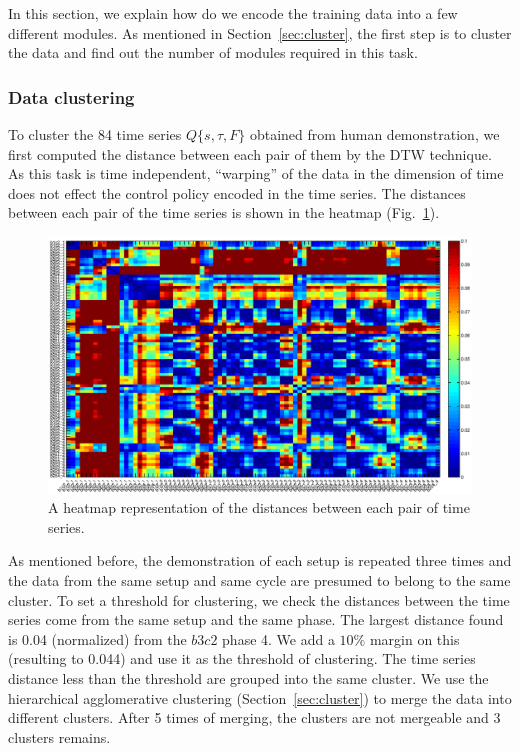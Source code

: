 In this section, we explain how do we encode the training data into a few different modules. As mentioned in Section~\ref{sec:cluster}, the first step is to cluster the data and find out the number of modules required in this task.

\subsubsection{Data clustering}
To cluster the 84 time series $Q\{s,\tau,F\}$ obtained from human demonstration, we first computed the distance between each pair of them by the DTW technique. As this task is time independent, ``warping'' of the data in the dimension of time does not effect the control policy encoded in the time series. The distances between each pair of the time series is shown in the heatmap (Fig.~\ref{fig:heatmap}).

\begin{figure}
\label{heatmap}
  \centering
  \includegraphics[width=17cm]{./fig/heatmap_all4.eps}
  \caption{ \scriptsize{A heatmap representation of the distances between each pair of time series.}
}
\label{fig:heatmap}
\end{figure}

As mentioned before, the demonstration of each setup is repeated three times and the data from the same setup and same cycle are presumed to belong to the same cluster. To set a threshold for clustering, we check the distances between the time series come from the same setup and the same phase. The largest distance found is 0.04 (normalized) from the $b3c2$ phase 4. We add a $10\%$ margin on this (resulting to 0.044) and use it as the threshold of clustering. The time series distance less than the threshold are grouped into the same cluster. We use the hierarchical agglomerative clustering (Section~\ref{sec:cluster}) to merge the data into different clusters. After 5 times of merging, the clusters are not mergeable and 3 clusters remains.

